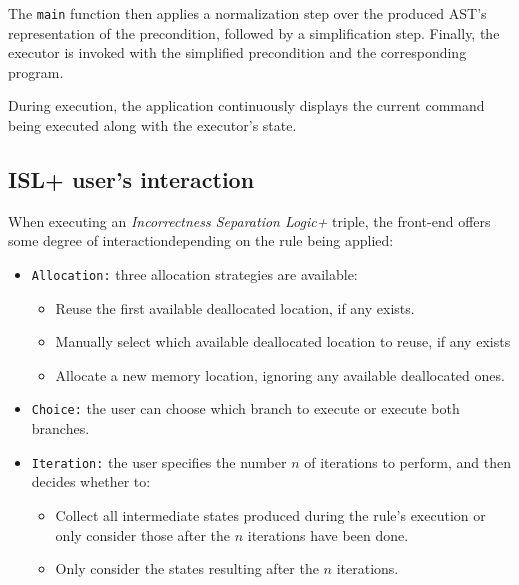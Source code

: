 \documentclass[parskip=half]{scrartcl}
\begin{document}
The \texttt{main} function then applies a normalization step over the produced AST's representation of the precondition, followed by a simplification step.
Finally, the executor is invoked with the simplified precondition and the corresponding program.

During execution, the application continuously displays the current command being executed along with the executor’s state.

\subsection{ISL+ user's interaction}
When executing an \textit{Incorrectness Separation Logic+} triple, the front-end offers some degree of interactiondepending on the rule being applied:

\begin{itemize}
  \item \texttt{Allocation:} three allocation strategies are available:
    \begin{itemize}
      \item Reuse the first available deallocated location, if any exists.
      \item Manually select which available deallocated location to reuse, if any exists
      \item Allocate a new memory location, ignoring any available deallocated ones.
    \end{itemize}
  \item \texttt{Choice:} the user can choose which branch to execute or execute both branches.
  \item \texttt{Iteration:} the user specifies the number $n$ of iterations to perform, and then decides whether to: 
    \begin{itemize}
      \item Collect all intermediate states produced during the rule's execution or only consider those after the $n$ iterations have been done.
      \item Only consider the states resulting after the $n$ iterations.
    \end{itemize}
\end{itemize}
\end{document}
